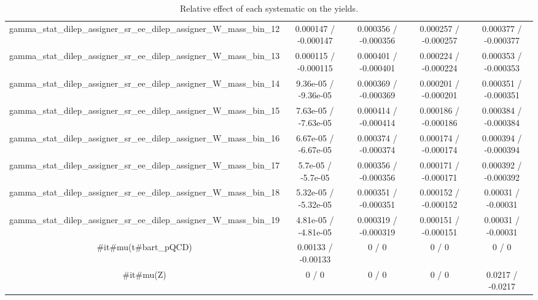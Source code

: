 \documentclass[10pt]{article}
\begin{document}
\begin{table}[htbp]
\begin{center}
\begin{tabular}{|c|c|c|c|c|}
  gamma_stat_dilep_assigner_sr_ee_dilep_assigner_W_mass_bin_12 & 0.000147 / -0.000147 & 0.000356 / -0.000356 & 0.000257 / -0.000257 & 0.000377 / -0.000377 \\ 
  gamma_stat_dilep_assigner_sr_ee_dilep_assigner_W_mass_bin_13 & 0.000115 / -0.000115 & 0.000401 / -0.000401 & 0.000224 / -0.000224 & 0.000353 / -0.000353 \\ 
  gamma_stat_dilep_assigner_sr_ee_dilep_assigner_W_mass_bin_14 & 9.36e-05 / -9.36e-05 & 0.000369 / -0.000369 & 0.000201 / -0.000201 & 0.000351 / -0.000351 \\ 
  gamma_stat_dilep_assigner_sr_ee_dilep_assigner_W_mass_bin_15 & 7.63e-05 / -7.63e-05 & 0.000414 / -0.000414 & 0.000186 / -0.000186 & 0.000384 / -0.000384 \\ 
  gamma_stat_dilep_assigner_sr_ee_dilep_assigner_W_mass_bin_16 & 6.67e-05 / -6.67e-05 & 0.000374 / -0.000374 & 0.000174 / -0.000174 & 0.000394 / -0.000394 \\ 
  gamma_stat_dilep_assigner_sr_ee_dilep_assigner_W_mass_bin_17 & 5.7e-05 / -5.7e-05 & 0.000356 / -0.000356 & 0.000171 / -0.000171 & 0.000392 / -0.000392 \\ 
  gamma_stat_dilep_assigner_sr_ee_dilep_assigner_W_mass_bin_18 & 5.32e-05 / -5.32e-05 & 0.000351 / -0.000351 & 0.000152 / -0.000152 & 0.00031 / -0.00031 \\ 
  gamma_stat_dilep_assigner_sr_ee_dilep_assigner_W_mass_bin_19 & 4.81e-05 / -4.81e-05 & 0.000319 / -0.000319 & 0.000151 / -0.000151 & 0.00031 / -0.00031 \\ 
  #it{#mu}(t#bar{t}_{pQCD}) & 0.00133 / -0.00133 & 0 / 0 & 0 / 0 & 0 / 0 \\ 
  #it{#mu}(Z) & 0 / 0 & 0 / 0 & 0 / 0 & 0.0217 / -0.0217 \\ 
\hline 
\end{tabular} 
\caption{Relative effect of each systematic on the yields.} 
\end{center} 
\end{table} 
\end{document}
